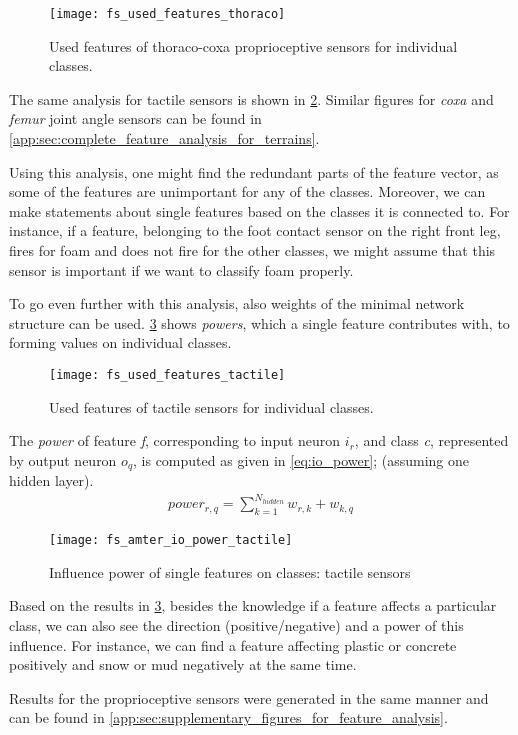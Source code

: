 \begin{figure}[H]
  \centering
  \texttt{[image: fs\_used\_features\_thoraco]}
  \caption{Used features of thoraco-coxa proprioceptive sensors for individual classes.}
  \label{fig:pa_amter_used_features_thoraco}
\end{figure}

The same analysis for tactile sensors is shown in \cref{fig:pa_amter_used_features_tactile}. Similar figures for \textit{coxa} and \textit{femur} joint angle sensors can be found in \cref{app:sec:complete_feature_analysis_for_terrains}.

Using this analysis, one might find the redundant parts of the feature vector, as some of the features are unimportant for any of the classes. Moreover, we can make statements about single features based on the classes it is connected to. For instance, if a feature, belonging to the foot contact sensor on the right front leg, fires for foam and does not fire for the other classes, we might assume that this sensor is important if we want to classify foam properly.

To go even further with this analysis, also weights of the minimal network structure can be used. \cref{fig:pa_amter_io_power_tactile} shows \textit{powers}, which a single feature contributes with, to forming values on individual classes. 

\begin{figure}[H]
  \centering
  \texttt{[image: fs\_used\_features\_tactile]}
  \caption{Used features of tactile sensors for individual classes.}
  \label{fig:pa_amter_used_features_tactile}
\end{figure}

The \textit{power} of feature \textit{f}, corresponding to input neuron $ i_r $, and class \textit{c}, represented by output neuron $ o_q $, is computed as given in \cref{eq:io_power}; (assuming one hidden layer).
\noindent
\begin{align} \label{eq:io_power}
power_{r,q} = \displaystyle{\sum_{k=1}^{N_{hidden}} w_{r, k} + w_{k, q}}
\end{align}

\begin{figure}[H]
  \centering
  \texttt{[image: fs\_amter\_io\_power\_tactile]}
  \caption{Influence power of single features on classes: tactile sensors}
  \label{fig:pa_amter_io_power_tactile}
\end{figure}

Based on the results in \cref{fig:pa_amter_io_power_tactile}, besides the knowledge if a feature affects a particular class, we can also see the direction (positive/negative) and a power of this influence. For instance, we can find a feature affecting plastic or concrete positively and snow or mud negatively at the same time. 

Results for the proprioceptive sensors were generated in the same manner and can be found in \cref{app:sec:supplementary_figures_for_feature_analysis}.

